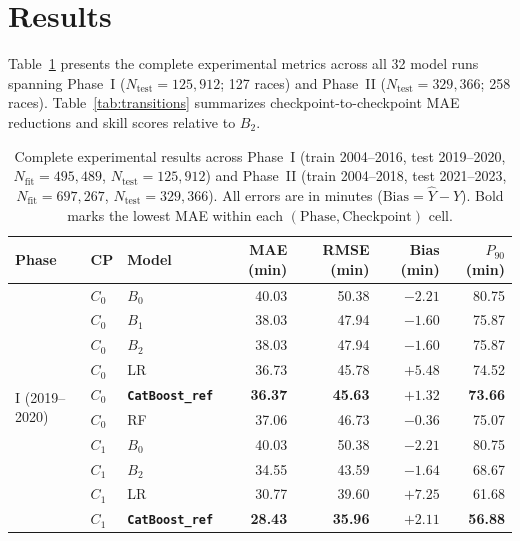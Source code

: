 \documentclass[11pt,a4paper]{article}
\begin{document}
\section{Results}

Table~\ref{tab:all_results} presents the complete experimental metrics
across all 32 model runs spanning Phase~I ($N_{\text{test}} =
125{,}912$; 127 races) and Phase~II ($N_{\text{test}} = 329{,}366$; 258
races). Table~\ref{tab:transitions} summarizes checkpoint-to-checkpoint
MAE reductions and skill scores relative to $B_2$.

\begin{table}[htbp]
\centering
\scriptsize
\caption{Complete experimental results across Phase~I (train
2004--2016, test 2019--2020, $N_{\text{fit}}=495{,}489$,
$N_{\text{test}}=125{,}912$) and Phase~II (train 2004--2018, test
2021--2023, $N_{\text{fit}}=697{,}267$, $N_{\text{test}}=329{,}366$).
All errors are in minutes ($\text{Bias} = \hat{Y} - Y$). Bold marks the
lowest MAE within each $(\text{Phase}, \text{Checkpoint})$ cell.}
\label{tab:all_results}
\renewcommand{\arraystretch}{1.12}
\begin{tabular}{lllrrrr}
\toprule
\textbf{Phase} & \textbf{CP} & \textbf{Model} & \textbf{MAE (min)}
  & \textbf{RMSE (min)} & \textbf{Bias (min)} & \textbf{$P_{90}$ (min)} \\
\midrule
\multirow{16}{*}{I (2019--2020)}
  & $C_0$ & $B_0$                  & 40.03 & 50.38 & $-2.21$ & 80.75 \\
  & $C_0$ & $B_1$                  & 38.03 & 47.94 & $-1.60$ & 75.87 \\
  & $C_0$ & $B_2$                  & 38.03 & 47.94 & $-1.60$ & 75.87 \\
  & $C_0$ & LR                     & 36.73 & 45.78 & $+5.48$ & 74.52 \\
  & $C_0$ & \textbf{\texttt{CatBoost\_ref}} & \textbf{36.37} & \textbf{45.63} & $+1.32$ & \textbf{73.66} \\
  & $C_0$ & RF                     & 37.06 & 46.73 & $-0.36$ & 75.07 \\
\cmidrule{2-7}
  & $C_1$ & $B_0$                  & 40.03 & 50.38 & $-2.21$ & 80.75 \\
  & $C_1$ & $B_2$                  & 34.55 & 43.59 & $-1.64$ & 68.67 \\
  & $C_1$ & LR                     & 30.77 & 39.60 & $+7.25$ & 61.68 \\
  & $C_1$ & \textbf{\texttt{CatBoost\_ref}} & \textbf{28.43} & \textbf{35.96} & $+2.11$ & \textbf{56.88} \\

\end{tabular}
\end{table}
\end{document}
